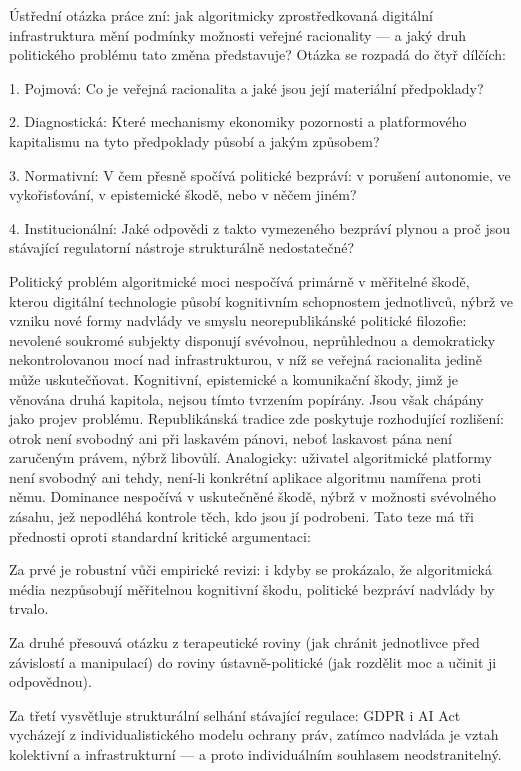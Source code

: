 Ústřední otázka práce zní: jak algoritmicky zprostředkovaná digitální infrastruktura mění podmínky možnosti veřejné racionality — a jaký druh politického problému tato změna představuje?
Otázka se rozpadá do čtyř dílčích:


1. Pojmová: Co je veřejná racionalita a jaké jsou její materiální předpoklady?


2. Diagnostická: Které mechanismy ekonomiky pozornosti a platformového kapitalismu na tyto předpoklady působí a jakým způsobem?


3. Normativní: V čem přesně spočívá politické bezpráví: v porušení autonomie, ve vykořisťování, v epistemické škodě, nebo v něčem jiném?


4. Institucionální: Jaké odpovědi z takto vymezeného bezpráví plynou a proč jsou stávající regulatorní nástroje strukturálně nedostatečné?


Politický problém algoritmické moci nespočívá primárně v měřitelné škodě, kterou digitální technologie působí kognitivním schopnostem jednotlivců, nýbrž ve vzniku nové formy nadvlády ve smyslu neorepublikánské politické filozofie: nevolené soukromé subjekty disponují svévolnou, neprůhlednou a demokraticky nekontrolovanou mocí nad infrastrukturou, v níž se veřejná racionalita jedině může uskutečňovat.
Kognitivní, epistemické a komunikační škody, jimž je věnována druhá kapitola, nejsou tímto tvrzením popírány.
Jsou však chápány jako projev problému. Republikánská tradice zde poskytuje rozhodující rozlišení: otrok není svobodný ani při laskavém pánovi, neboť laskavost pána není zaručeným právem, nýbrž libovůlí.
Analogicky: uživatel algoritmické platformy není svobodný ani tehdy, není-li konkrétní aplikace algoritmu namířena proti němu.
Dominance nespočívá v uskutečněné škodě, nýbrž v možnosti svévolného zásahu, jež nepodléhá kontrole těch, kdo jsou jí podrobeni.
Tato teze má tři přednosti oproti standardní kritické argumentaci:

Za prvé je robustní vůči empirické revizi: i kdyby se prokázalo, že algoritmická média nezpůsobují měřitelnou kognitivní škodu, politické bezpráví nadvlády by trvalo.

Za druhé přesouvá otázku z terapeutické roviny (jak chránit jednotlivce před závislostí a manipulací) do roviny ústavně-politické (jak rozdělit moc a učinit ji odpovědnou).

Za třetí vysvětluje strukturální selhání stávající regulace: GDPR i AI Act vycházejí z individualistického modelu ochrany práv, zatímco nadvláda je vztah kolektivní a infrastrukturní — a proto individuálním souhlasem neodstranitelný.


